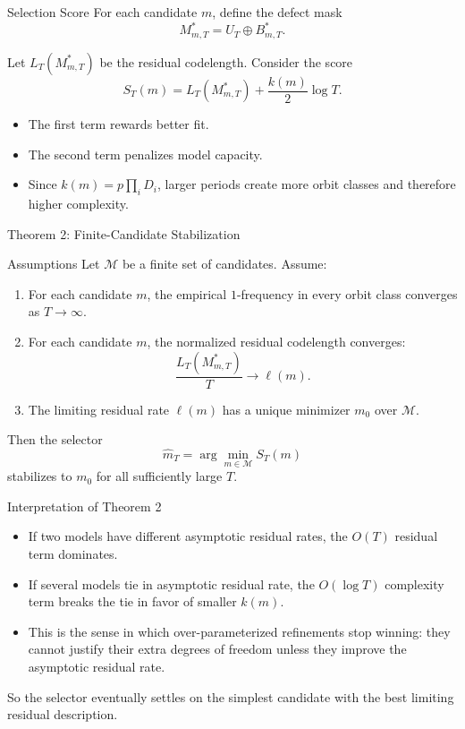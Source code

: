 \documentclass[aspectratio=169]{beamer}
\begin{document}
\begin{frame}{Selection Score}
  For each candidate $m$, define the defect mask
  \[
    M^*_{m,T} = U_T \oplus B^*_{m,T}.
  \]

  Let $L_T(M^*_{m,T})$ be the residual codelength. Consider the score
  \[
    S_T(m) = L_T(M^*_{m,T}) + \frac{k(m)}{2}\log T.
  \]

  \begin{itemize}
    \item The first term rewards better fit.
    \item The second term penalizes model capacity.
    \item Since $k(m) = p \prod_i D_i$, larger periods create more orbit classes and therefore higher complexity.
  \end{itemize}
\end{frame}

\begin{frame}{Theorem 2: Finite-Candidate Stabilization}
  \begin{block}{Assumptions}
    Let $\mathcal{M}$ be a finite set of candidates. Assume:
    \begin{enumerate}
      \item For each candidate $m$, the empirical $1$-frequency in every orbit class converges as $T \to \infty$.
      \item For each candidate $m$, the normalized residual codelength converges:
      \[
        \frac{L_T(M^*_{m,T})}{T} \to \ell(m).
      \]
      \item The limiting residual rate $\ell(m)$ has a unique minimizer $m_0$ over $\mathcal{M}$.
    \end{enumerate}
  \end{block}

  Then the selector
  \[
    \hat m_T = \arg\min_{m \in \mathcal{M}} S_T(m)
  \]
  stabilizes to $m_0$ for all sufficiently large $T$.
\end{frame}

\begin{frame}{Interpretation of Theorem 2}
  \begin{itemize}
    \item If two models have different asymptotic residual rates, the $O(T)$ residual term dominates.
    \item If several models tie in asymptotic residual rate, the $O(\log T)$ complexity term breaks the tie in favor of smaller $k(m)$.
    \item This is the sense in which over-parameterized refinements stop winning: they cannot justify their extra degrees of freedom unless they improve the asymptotic residual rate.
  \end{itemize}

  \vspace{0.5em}
  So the selector eventually settles on the simplest candidate with the best limiting residual description.
\end{frame}
\end{document}
